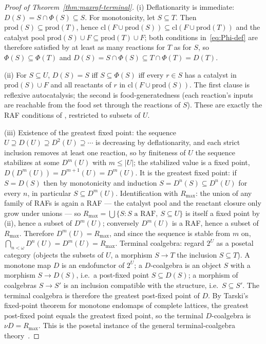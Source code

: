 \documentclass[11pt,a4paper]{article}
\theoremstyle{plain}
\theoremstyle{definition}
\theoremstyle{remark}
\begin{document}
\begin{proof}[Proof of Theorem~\ref{thm:maxraf-terminal}]
(i) Deflationarity is immediate: $D(S)=S\cap\Phi(S)\subseteq S$.
For monotonicity, let $S\subseteq T$. Then
$\mathrm{prod}(S)\subseteq\mathrm{prod}(T)$, hence
$\mathrm{cl}(F\cup\mathrm{prod}(S))\subseteq
\mathrm{cl}(F\cup\mathrm{prod}(T))$ and the catalyst pool
$\mathrm{prod}(S)\cup F\subseteq\mathrm{prod}(T)\cup F$; both
conditions in~\eqref{eq:Phi-def} are therefore satisfied by at
least as many reactions for $T$ as for $S$, so
$\Phi(S)\subseteq\Phi(T)$ and
$D(S)=S\cap\Phi(S)\subseteq T\cap\Phi(T)=D(T)$.

(ii) For $S\subseteq U$, $D(S)=S$ iff $S\subseteq\Phi(S)$ iff
every $r\in S$ has a catalyst in $\mathrm{prod}(S)\cup F$ and all
reactants of $r$ in $\mathrm{cl}(F\cup\mathrm{prod}(S))$. The
first clause is reflexive autocatalysis; the second is
food-generatedness (each reaction's inputs are reachable from the
food set through the reactions of $S$). These are exactly the RAF
conditions of \citealp{hordijk2011,steel2004}, restricted to
subsets of $U$.

(iii) Existence of the greatest fixed point: the sequence
$U\supseteq D(U)\supseteq D^{2}(U)\supseteq\cdots$ is decreasing
by deflationarity, and each strict inclusion removes at least one
reaction, so by finiteness of $U$ the sequence stabilizes at some
$D^{m}(U)$ with $m\leq|U|$; the stabilized value is a fixed point,
$D(D^{m}(U))=D^{m+1}(U)=D^{m}(U)$. It is the greatest fixed
point: if $S=D(S)$ then by monotonicity and induction
$S=D^{n}(S)\subseteq D^{n}(U)$ for every $n$, in particular
$S\subseteq D^{m}(U)$. Identification with $R_{\max}$: the union
of any family of RAFs is again a RAF --- the catalyst pool and
the reactant closure only grow under unions --- so
$R_{\max}=\bigcup\{S : S\text{ a RAF},\ S\subseteq U\}$ is itself
a fixed point by (ii), hence a subset of $D^{m}(U)$; conversely
$D^{m}(U)$ is a RAF, hence a subset of $R_{\max}$. Therefore
$D^{m}(U)=R_{\max}$, and since the sequence is stable from $m$
on, $\bigcap_{n<\omega}D^{n}(U)=D^{m}(U)=R_{\max}$. Terminal
coalgebra: regard $2^{U}$ as a posetal category (objects the
subsets of $U$, a morphism $S\to T$ the inclusion $S\subseteq T$).
A monotone map $D$ is an endofunctor of $2^{U}$; a $D$-coalgebra
is an object $S$ with a morphism $S\to D(S)$, i.e.\ a post-fixed
point $S\subseteq D(S)$; a morphism of coalgebras $S\to S'$ is an
inclusion compatible with the structure, i.e.\ $S\subseteq S'$.
The terminal coalgebra is therefore the greatest post-fixed
point of $D$. By Tarski's fixed-point theorem for monotone
endomaps of complete lattices, the greatest post-fixed point
equals the greatest fixed point, so the terminal $D$-coalgebra is
$\nu D=R_{\max}$. This is the posetal instance of the general
terminal-coalgebra theory~\citep{adamek2005,worrell2005}.


\end{proof}
\end{document}
